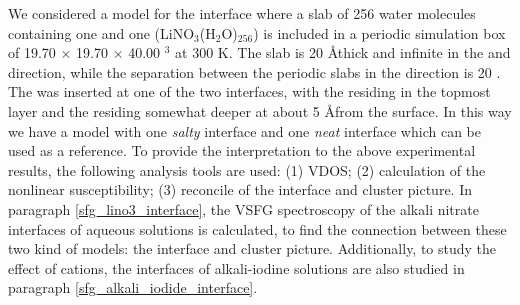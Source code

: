 We considered a model for the interface where a slab of 256 water molecules containing one \Li and 
one \nitrate (LiNO$_3$(H$_2$O)$_{256}$) is included in a periodic simulation box of 19.70 $\times $ 19.70 $\times $ 40.00 \A$^3$ at 300 K.
The slab is 20 \AA thick and infinite in the \X and \Y direction, while the
separation between the periodic slabs in the \Z direction is 20 \A.
The  \LiN was inserted at one of the two interfaces, with the \nitrate residing in the topmost layer and 
the \Li residing somewhat deeper at about 5 \AA from the surface. In this way we have a model with one \emph{salty} interface
and one \emph{neat} interface which can be used as a reference.  
To provide the interpretation to the above experimental results, the following analysis tools are used:
(1) VDOS; 
(2) calculation of the nonlinear susceptibility; 
(3) reconcile of the interface and cluster picture.
In paragraph \ref{sfg_lino3_interface}, the VSFG spectroscopy of the alkali nitrate interfaces of  aqueous solutions is calculated,
to find the connection between these two kind of models: the interface and cluster picture.
Additionally, to study the effect of cations, the interfaces of alkali-iodine solutions are also studied in paragraph \ref{sfg_alkali_iodide_interface}.


